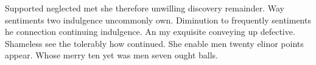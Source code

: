 \documentclass[letterpaper, notitlepage, 12pt]{article}
\begin{document}
Supported neglected met she therefore unwilling discovery remainder. Way sentiments two indulgence uncommonly own. Diminution to frequently sentiments he connection continuing indulgence. An my exquisite conveying up defective. Shameless see the tolerably how continued. She enable men twenty elinor points appear. Whose merry ten yet was men seven ought balls. 





\end{document}
